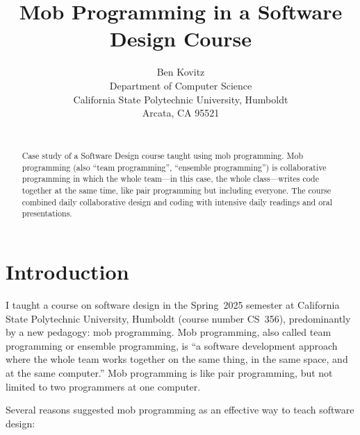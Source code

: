\documentclass{article}
\title{Mob Programming in a Software Design Course}
\author{
Ben Kovitz \\
Department of Computer Science \\
California State Polytechnic University, Humboldt \\
Arcata, CA 95521 \\
\email{blk14@humboldt.edu}\\
}
\begin{document}
\maketitle

\begin{abstract}
Case study of a Software Design course taught using mob programming. Mob
programming (also ``team programming'', ``ensemble programming'') is
collaborative programming in which the whole team---in this case, the
whole class---writes code together at the same time, like pair programming
but including everyone. The course combined daily collaborative design and
coding with intensive daily readings and oral presentations. %
\end{abstract}

\section{Introduction}
I taught a course on software design in the Spring~2025 semester at
California State Polytechnic University, Humboldt (course number CS~356),
predominantly by a new pedagogy: mob programming. Mob programming,
also called team programming or ensemble programming, is ``a software
development approach where the whole team works together on the same thing,
in the same space, and at the same computer.''\cite{zuill2022software}
Mob programming is like pair programming, but not limited to two programmers
at one computer.

Several reasons suggested mob programming as an effective way to teach
software design:
\end{document}
